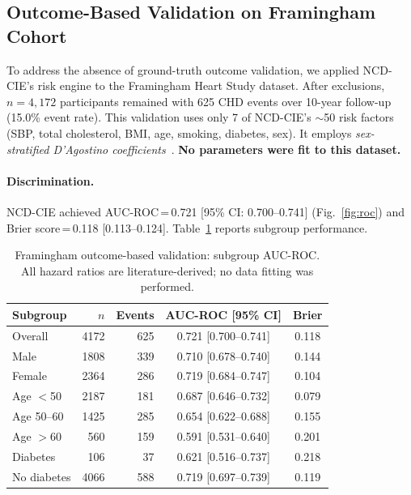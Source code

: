 \documentclass[runningheads]{llncs}
\begin{document}
\subsection{Outcome-Based Validation on Framingham Cohort}\label{sec:framingham}

To address the absence of ground-truth outcome validation, we applied
NCD-CIE's risk engine to the Framingham Heart Study dataset.
After exclusions, $n = 4{,}172$ participants remained with 625 CHD
events over 10-year follow-up (15.0\% event rate).
This validation uses only 7 of NCD-CIE's ${\sim}$50 risk factors
(SBP, total cholesterol, BMI, age, smoking, diabetes, sex).
It employs \emph{sex-stratified D'Agostino
coefficients}~\cite{dagostino2008}.
\textbf{No parameters were fit to this dataset.}

\paragraph{Discrimination.}
NCD-CIE achieved AUC-ROC\,=\,0.721 [95\% CI: 0.700--0.741]
(Fig.~\ref{fig:roc}) and
Brier score\,=\,0.118 [0.113--0.124].
Table~\ref{tab:framingham_sub} reports subgroup performance.

\renewcommand{\arraystretch}{1.2}
\begin{table}[t]
\centering
\caption{Framingham outcome-based validation: subgroup AUC-ROC.
All hazard ratios are literature-derived; no data fitting was performed.}
\label{tab:framingham_sub}
\small
\begin{tabular}{@{}lrrcc@{}}
\toprule
\textbf{Subgroup} & \textbf{$n$} & \textbf{Events} & \textbf{AUC-ROC [95\% CI]} & \textbf{Brier} \\
\midrule
Overall     & 4172 & 625 & 0.721 [0.700--0.741] & 0.118 \\
Male        & 1808 & 339 & 0.710 [0.678--0.740] & 0.144 \\
Female      & 2364 & 286 & 0.719 [0.684--0.747] & 0.104 \\
Age ${<}$50 & 2187 & 181 & 0.687 [0.646--0.732] & 0.079 \\
Age 50--60  & 1425 & 285 & 0.654 [0.622--0.688] & 0.155 \\
Age ${>}$60 &  560 & 159 & 0.591 [0.531--0.640] & 0.201 \\
Diabetes    &  106 &  37 & 0.621 [0.516--0.737] & 0.218 \\
No diabetes & 4066 & 588 & 0.719 [0.697--0.739] & 0.119 \\
\bottomrule
\end{tabular}
\end{table}
\renewcommand{\arraystretch}{1.0}
\end{document}
